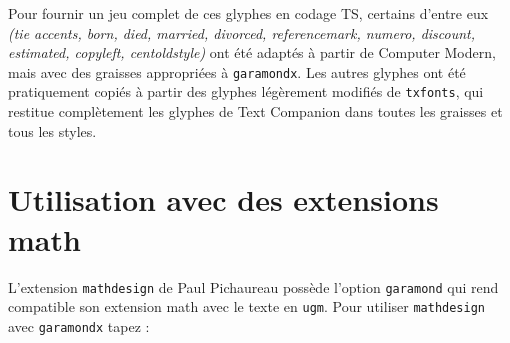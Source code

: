 \documentclass[12pt,english,french]{article}
\begin{document}
Pour fournir un jeu complet de ces glyphes en codage TS, certains d'entre eux \emph{(tie accents, born, died, married, divorced, referencemark, numero, discount, estimated, copyleft, centoldstyle)} ont été adaptés à partir de Computer Modern, mais avec des graisses appropriées à \texttt{garamondx}. Les autres glyphes ont été pratiquement copiés à partir des glyphes légèrement modifiés de \texttt{txfonts}, qui restitue complètement les glyphes de Text Companion dans toutes les graisses et tous les styles.

\section{Utilisation avec des extensions math}


L'extension \texttt{mathdesign} de Paul Pichaureau possède l'option \texttt{garamond} qui rend compatible son extension math avec le texte en \texttt{ugm}. Pour utiliser \texttt{mathdesign} avec \texttt{garamondx} tapez :
\end{document}
